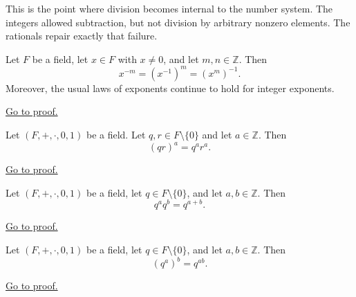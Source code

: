 \begin{remark}
This is the point where division becomes internal to the number system.
The integers allowed subtraction, but not division by arbitrary nonzero
elements. The rationals repair exactly that failure.
\end{remark}

\begin{theorem}
\label{thm:negative-exponents-agree-with-inverse-power}
Let $F$ be a field, let $x\in F$ with $x\neq 0$, and let $m,n\in\mathbb{Z}$.
Then
\[
x^{-m}=(x^{-1})^m=(x^m)^{-1}.
\]
Moreover, the usual laws of exponents continue to hold for integer exponents.
\end{theorem}

\begin{remark*}[Proof]
\hyperref[prf:negative-exponents-agree-with-inverse-power]{Go to proof.}
\end{remark*}

\begin{theorem}
\label{thm:power-of-product-in-field}
Let $(F,+,\cdot,0,1)$ be a field. Let $q,r\in F\setminus\{0\}$ and let
$a\in\mathbb{Z}$. Then
\[
(qr)^a=q^a r^a.
\]
\end{theorem}

\begin{remark*}[Proof]
\hyperref[prf:power-of-product-in-field]{Go to proof.}
\end{remark*}

\begin{theorem}
\label{thm:integer-exponent-addition-law}
Let $(F,+,\cdot,0,1)$ be a field, let $q\in F\setminus\{0\}$, and let
$a,b\in\mathbb{Z}$. Then
\[
q^a q^b=q^{a+b}.
\]
\end{theorem}

\begin{remark*}[Proof]
\hyperref[prf:integer-exponent-addition-law]{Go to proof.}
\end{remark*}

\begin{theorem}
\label{thm:power-of-a-power-in-field}
Let $(F,+,\cdot,0,1)$ be a field, let $q\in F\setminus\{0\}$, and let
$a,b\in\mathbb{Z}$. Then
\[
(q^a)^b=q^{ab}.
\]
\end{theorem}

\begin{remark*}[Proof]
\hyperref[prf:power-of-a-power-in-field]{Go to proof.}
\end{remark*}

